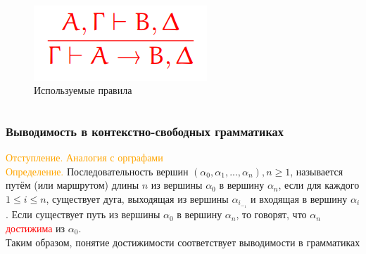 \documentclass{beamer}
\begin{document}
\begin{frame}
\begin{columns}
\begin{figure}[!tbp]
\begin{minipage}[b]{\textwidth}
          \end{minipage}\\
          \begin{minipage}[b]{\textwidth}
          \includegraphics[width=\textwidth]{rule3.png}
          \end{minipage}
          \caption{Используемые правила}
        \end{figure}
    
    \end{columns}
    
         
         
      
	\end{frame}
	
	\begin{frame}
    \frametitle{Выводимость в контекстно-свободных грамматиках}
        \textcolor{orange}{Отступление. Аналогия с орграфами}\\  
        \vspace{3mm}
         \textcolor{orange}{Определение.} Последовательность вершин $(\alpha_0, \alpha_1,...,\alpha_n), n \geq 1$, называется путём (или маршрутом) длины $n$ из вершины $\alpha_0$ в вершину $\alpha_n$, если для каждого $1 \leq i \leq n$, существует дуга, выходящая из вершины $\alpha_i_-_1$ и входящая в вершину $\alpha_i$. Если существует путь из вершины $\alpha_0$ в вершину $\alpha_n$, то говорят, что $\alpha_n$ \textcolor{red}{достижима} из $\alpha_0$.\\
         \vspace{3mm}
         Таким образом, понятие достижимости соответствует выводимости в грамматиках
 
	\end{frame}
	
\end{document}
